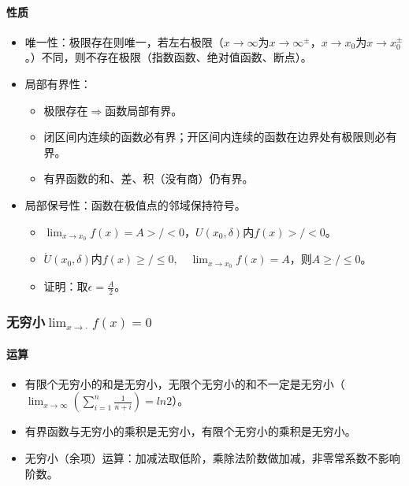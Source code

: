 \documentclass[
12pt, %
a4paper, 
oneside, %
]{scrartcl}
\begin{document}
\paragraph{性质}
\begin{itemize}
\item 唯一性：极限存在则唯一，若左右极限（$ x \to \infty $为$ x \to \infty^\pm $，$ x \to x_0 $为$ x \to x_0^\pm $。）不同，则不存在极限（指数函数、绝对值函数、断点）。
\item 局部有界性：
\begin{itemize}
\item 极限存在$ \Rightarrow $函数局部有界。
\item 闭区间内连续的函数必有界；开区间内连续的函数在边界处有极限则必有界。
\item 有界函数的和、差、积（没有商）仍有界。
\end{itemize}
\item 局部保号性：函数在极值点的邻域保持符号。
\begin{itemize}
\item $ \lim_{x \to x_0} f(x) = A >/< 0 $，$ U(x_0, \delta) $内$ f(x) >/< 0 $。
\item $ \mathring{U}(x_0, \delta) $内$ f(x) \geq /\leq 0, \quad \lim_{x \to x_0} f(x) = A $，则$ A \geq/\leq 0 $。
\item 证明：取$ \epsilon = \frac{A}{2} $。
\end{itemize}
\end{itemize}
\subsubsection[无穷小]{无穷小$ \lim_{x \to \cdot} f(x) = 0 $}
\paragraph{运算}
\begin{itemize}
\item 有限个无穷小的和是无穷小，无限个无穷小的和不一定是无穷小（$ \lim_{x \to \infty}(\sum_{i = 1}^{n} \frac{1}{n + i}) = ln 2 $）。
\item 有界函数与无穷小的乘积是无穷小，有限个无穷小的乘积是无穷小。
\item 无穷小（余项）运算：加减法取低阶，乘除法阶数做加减，非零常系数不影响阶数。
\end{itemize}
\end{document}
